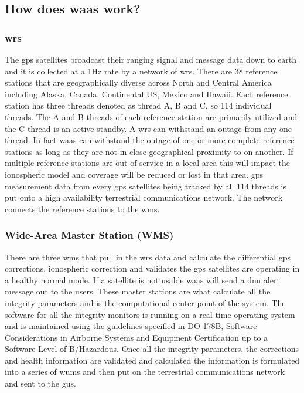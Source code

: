 \subsection{How does \ac{waas} work?}\label{how-does-waas-work}

\subsubsection{\ac{wrs}}\label{waas-reference-stations}

The \ac{gps} satellites broadcast their ranging signal and message data down
to earth and it is collected at a 1Hz rate by a network of \ac{wrs}. There are 38 reference stations that are
geographically diverse across North and Central America including
Alaska, Canada, Continental US, Mexico and Hawaii. Each reference
station has three threads denoted as thread A, B and C, so 114
individual threads. The A and B threads of each reference station are
primarily utilized and the C thread is an active standby. A \ac{wrs} can
withstand an outage from any one thread. In fact \ac{waas} can withstand the
outage of one or more complete reference stations as long as they are
not in close geographical proximity to on another. If multiple reference
stations are out of service in a local area this will impact the
ionospheric model and coverage will be reduced or lost in that area. \ac{gps}
measurement data from every \ac{gps} satellites being tracked by all 114
threads is put onto a high availability terrestrial communications
network. The network connects the reference stations to the \ac{wms}.

\subsubsection{Wide-Area Master Station (WMS)}\label{waas-master-stations}

There are three \ac{wms} that pull in the \ac{wrs} data and
calculate the differential \ac{gps} corrections, ionospheric correction and
validates the \ac{gps} satellites are operating in a healthy normal mode. If
a satellite is not usable \ac{waas} will send a \ac{dnu} alert
message out to the users. These master stations are what calculate all
the integrity parameters and is the computational center point of the
system. The software for all the integrity monitors is running on a
real-time operating system and is maintained using the guidelines
specified in DO-178B, Software Considerations in Airborne Systems and
Equipment Certification up to a Software Level of B/Hazardous. Once all
the integrity parameters, the corrections and health information are
validated and calculated the information is formulated into a series of
\acp{wum} and then put on the terrestrial communications
network and sent to the \ac{gus}.

